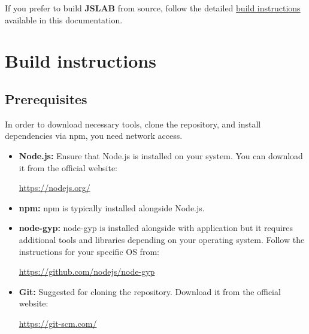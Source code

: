 \documentclass[12pt,a4paper]{article}
\begin{document}
If you prefer to build \textbf{JSLAB} from source, follow the detailed \hyperref[build-instructions]{build instructions} available in this documentation.

\section{Build instructions}
\label{build-instructions}

\subsection{Prerequisites}

In order to download necessary tools, clone the repository, and install dependencies via npm, you need network access.

\begin{itemize}
    \item \textbf{Node.js:} Ensure that Node.js is installed on your system. You can download it from the official website: 
    
    \url{https://nodejs.org/}
    
    \item \textbf{npm:} npm is typically installed alongside Node.js.
    
    \item \textbf{node-gyp:} node-gyp is installed alongside with application but it requires additional tools and libraries depending on your operating system. Follow the instructions for your specific OS from: 
    
    \url{https://github.com/nodejs/node-gyp}
    
    \item \textbf{Git:} Suggested for cloning the repository. Download it from the official website: 
    
    \url{https://git-scm.com/}

\end{itemize}

\end{document}
